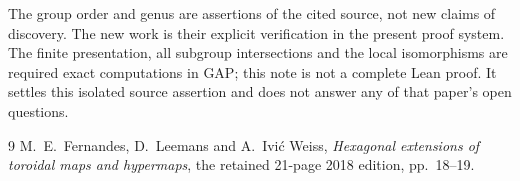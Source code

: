 \documentclass[11pt,a4paper]{article}
\begin{document}
The group order and genus are assertions of the cited source, not new
claims of discovery. The new work is their explicit verification in the
present proof system. The finite presentation, all subgroup intersections
and the local isomorphisms are required exact computations in GAP; this
note is not a complete Lean proof. It settles this isolated source
assertion and does not answer any of that paper's open questions.

\begin{thebibliography}{9}
 M.~E.~Fernandes, D.~Leemans and A.~Ivi\'c Weiss,
\emph{Hexagonal extensions of toroidal maps and hypermaps},
the retained 21-page 2018 edition, pp.~18--19.
\end{thebibliography}
\end{document}
